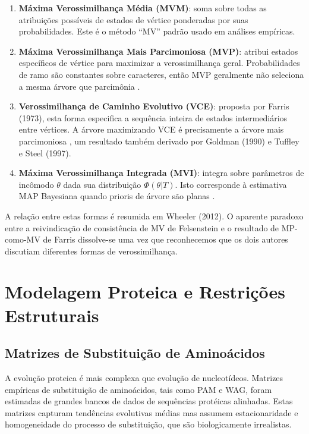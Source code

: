 \begin{enumerate}
    \item \textbf{Máxima Verossimilhança Média (MVM)}: soma sobre todas as atribuições possíveis de estados de vértice ponderadas por suas probabilidades. Este é o método ``MV'' padrão usado em análises empíricas.

    \item \textbf{Máxima Verossimilhança Mais Parcimoniosa (MVP)}: atribui estados específicos de vértice para maximizar a verossimilhança geral. Probabilidades de ramo são constantes sobre caracteres, então MVP geralmente não seleciona a mesma árvore que parcimônia \parencite{wheeler2012}.

    \item \textbf{Verossimilhança de Caminho Evolutivo (VCE)}: proposta por Farris (1973), esta forma especifica a sequência inteira de estados intermediários entre vértices. A árvore maximizando VCE é precisamente a árvore mais parcimoniosa \parencite{wheeler2012}, um resultado também derivado por Goldman (1990) e Tuffley e Steel (1997).

    \item \textbf{Máxima Verossimilhança Integrada (MVI)}: integra sobre parâmetros de incômodo $\theta$ dada sua distribuição $\Phi(\theta|T)$. Isto corresponde à estimativa MAP Bayesiana quando prioris de árvore são planas \parencite{wheeler2012,steel2000}.
\end{enumerate}

A relação entre estas formas é resumida em Wheeler (2012). O aparente paradoxo entre a reivindicação de consistência de MV de Felsenstein e o resultado de MP-como-MV de Farris dissolve-se uma vez que reconhecemos que os dois autores discutiam diferentes formas de verossimilhança.

\section{Modelagem Proteica e Restrições Estruturais}

\subsection{Matrizes de Substituição de Aminoácidos}

A evolução proteica é mais complexa que evolução de nucleotídeos. Matrizes empíricas de substituição de aminoácidos, tais como PAM e WAG, foram estimadas de grandes bancos de dados de sequências protéicas alinhadas. Estas matrizes capturam tendências evolutivas médias mas assumem estacionaridade e homogeneidade do processo de substituição, que são biologicamente irrealistas.

